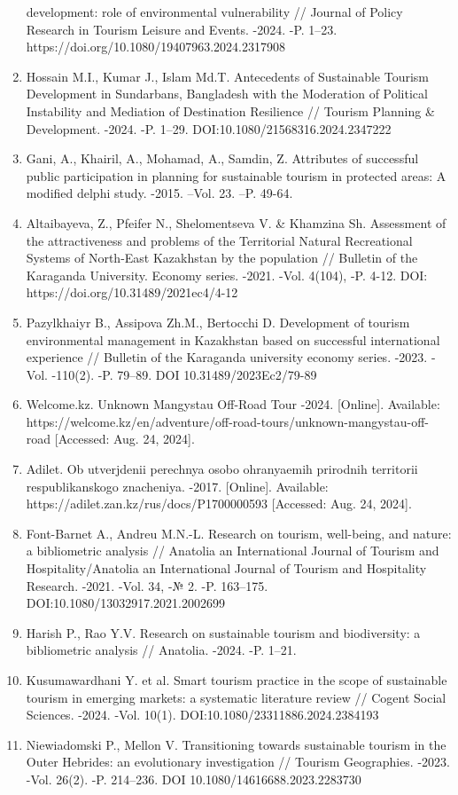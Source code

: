 \begin{enumerate}
  development: role of environmental vulnerability // Journal of Policy
  Research in Tourism Leisure and Events. -2024. -P. 1--23.
  https://doi.org/10.1080/19407963.2024.2317908
\item
  Hossain M.I., Kumar J., Islam Md.T. Antecedents of Sustainable Tourism
  Development in Sundarbans, Bangladesh with the Moderation of Political
  Instability and Mediation of Destination Resilience // Tourism
  Planning \& Development. -2024. -P. 1--29.
  DOI:10.1080/21568316.2024.2347222
\item
  Gani, A., Khairil, A., Mohamad, A., Samdin, Z. Attributes of
  successful public participation in planning for sustainable tourism in
  protected areas: A modified delphi study. -2015. --Vol. 23. --P.
  49-64.
\item
  Altaibayeva, Z., Pfeifer N., Shelomentseva V. \& Khamzina Sh.
  Assessment of the attractiveness and problems of the Territorial
  Natural Recreational Systems of North-East Kazakhstan by the
  population // Bulletin of the Karaganda University. Economy series.
  -2021. -Vol. 4(104), -P. 4-12. DOI:
  https://doi.org/10.31489/2021ec4/4-12
\item
  Pazylkhaiyr B., Assipova Zh.M., Bertocchi D. Development of tourism
  environmental management in Kazakhstan based on successful
  international experience // Bulletin of the Karaganda university
  economy series. -2023. -Vol. -110(2). -P. 79--89. DOI
  10.31489/2023Ec2/79-89
\item
  Welcome.kz. Unknown Mangystau Off-Road Tour -2024. {[}Online{]}.
  Available:
  https://welcome.kz/en/adventure/off-road-tours/unknown-mangystau-off-road
  {[}Accessed: Aug. 24, 2024{]}.
\item
  Adilet. Ob utverjdenii perechnya osobo ohranyaemih prirodnih
  territorii respublikanskogo znacheniya. -2017. {[}Online{]}.
  Available: https://adilet.zan.kz/rus/docs/P1700000593 {[}Accessed:
  Aug. 24, 2024{]}.
\item
  Font-Barnet A., Andreu M.N.-L. Research on tourism, well-being, and
  nature: a bibliometric analysis // Anatolia an International Journal
  of Tourism and Hospitality/Anatolia an International Journal of
  Tourism and Hospitality Research. -2021. -Vol. 34, -№ 2. -P. 163--175.
  DOI:10.1080/13032917.2021.2002699
\item
  Harish P., Rao Y.V. Research on sustainable tourism and biodiversity:
  a bibliometric analysis // Anatolia. -2024. -P. 1--21.
\item
  Kusumawardhani Y. et al. Smart tourism practice in the scope of
  sustainable tourism in emerging markets: a systematic literature
  review // Cogent Social Sciences. -2024. -Vol. 10(1).
  DOI:10.1080/23311886.2024.2384193
\item
  Niewiadomski P., Mellon V. Transitioning towards sustainable tourism
  in the Outer Hebrides: an evolutionary investigation // Tourism
  Geographies. -2023. -Vol. 26(2). -P. 214--236. DOI
  10.1080/14616688.2023.2283730
\end{enumerate}

